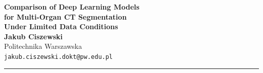 \documentclass[a0paper,36pt]{extarticle}
\begin{document}
\begin{center}
  {\fontsize{64}{64}\selectfont\bfseries\color{pwrdark}%
    Comparison of Deep Learning Models}\\[10pt]
  {\fontsize{64}{64}\selectfont\bfseries\color{pwrdark}%
    for Multi-Organ CT Segmentation}\\[10pt]
  {\fontsize{64}{64}\selectfont\bfseries\color{pwrdark}%
    Under Limited Data Conditions}\\[22pt]
  {\fontsize{42}{50}\selectfont\color{pwrviolet}\bfseries
    Jakub Ciszewski}\\[14pt]
  {\fontsize{32}{40}\selectfont\color{mutedtext}
    Politechnika Warszawska}\\[10pt]
  {\fontsize{30}{38}\selectfont\color{mutedtext}
    \texttt{jakub.ciszewski.dokt@pw.edu.pl}}
\end{center}

\vspace{4mm}
\noindent\textcolor{pwrviolet}{\rule{\linewidth}{2pt}}
\vspace{2mm}
\end{document}
